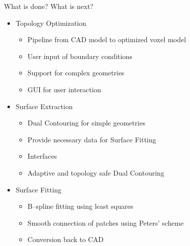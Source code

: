 \begin{frame}{What is done? What is next?}
\begin{itemize}

\item<+-> Topology Optimization
\begin{itemize}
	\item[\textcolor{green}{\Checkmark}] Pipeline from CAD model to optimized voxel model
	\item[\textcolor{green}{\Checkmark}] User input of boundary conditions
	\item[\textcolor{black}{\VarClock}] Support for complex geometries
	\item[\textcolor{red}{\XSolidBrush}] GUI for user interaction
\end{itemize}

\item<+-> Surface Extraction
\begin{itemize}
	\item[\textcolor{green}{\Checkmark}] Dual Contouring for simple geometries
	\item[\textcolor{green}{\Checkmark}] Provide necessary data for Surface Fitting
	\item[\textcolor{black}{\VarClock}] Interfaces
	\item[\textcolor{red}{\XSolidBrush}] Adaptive and topology safe Dual Contouring
\end{itemize}

\item<+-> Surface Fitting
\begin{itemize}
	\item[\textcolor{green}{\Checkmark}] B--spline fitting using least squares
	\item[\textcolor{green}{\Checkmark}] Smooth connection of patches using Peters' scheme
	\item[\textcolor{red}{\XSolidBrush}] Conversion back to CAD
\end{itemize}
\end{itemize}
\end{frame}
